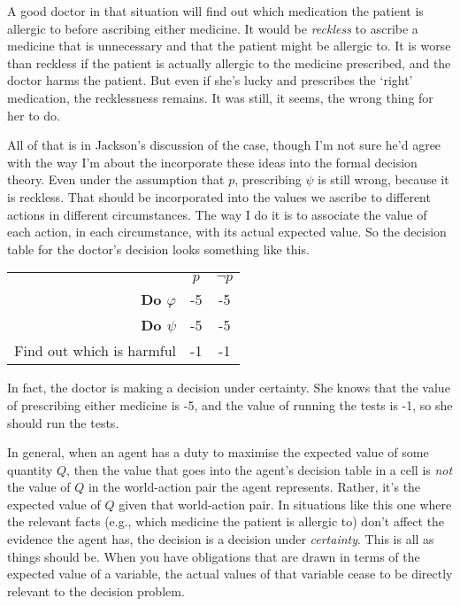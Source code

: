 \documentclass[11pt,oneside]{book}
\begin{document}
A good doctor in that situation will find out which medication the patient is allergic to before ascribing either medicine. It would be \textit{reckless} to ascribe a medicine that is unnecessary and that the patient might be allergic to. It is worse than reckless if the patient is actually allergic to the medicine prescribed, and the doctor harms the patient. But even if she's lucky and prescribes the `right' medication, the recklessness remains. It was still, it seems, the wrong thing for her to do.

All of that is in Jackson's discussion of the case, though I'm not sure he'd agree with the way I'm about the incorporate these ideas into the formal decision theory. Even under the assumption that \(p\), prescribing \(\psi\) is still wrong, because it is reckless. That should be incorporated into the values we ascribe to different actions in different circumstances. The way I do it is to associate the value of each action, in each circumstance, with its actual expected value. So the decision table for the doctor's decision looks something like this.

\begin{center}
\begin{tabular}{r c c}
 & \(p\) & \(\neg p\) \\
\textbf{Do \(\varphi\)} & -5 & -5 \\
\textbf{Do \(\psi\)} & -5 & -5 \\
Find out which is harmful & -1 & -1 \\
\end{tabular}
\end{center}

\noindent In fact, the doctor is making a decision under certainty. She knows that the value of prescribing either medicine is -5, and the value of running the tests is -1, so she should run the tests.

In general, when an agent has a duty to maximise the expected value of some quantity \(Q\), then the value that goes into the agent's decision table in a cell is \textit{not} the value of \(Q\) in the world-action pair the agent represents. Rather, it's the expected value of \(Q\) given that world-action pair. In situations like this one where the relevant facts (e.g., which medicine the patient is allergic to) don't affect the evidence the agent has, the decision is a decision under \textit{certainty}. This is all as things should be. When you have obligations that are drawn in terms of the expected value of a variable, the actual values of that variable cease to be directly relevant to the decision problem.
\end{document}
